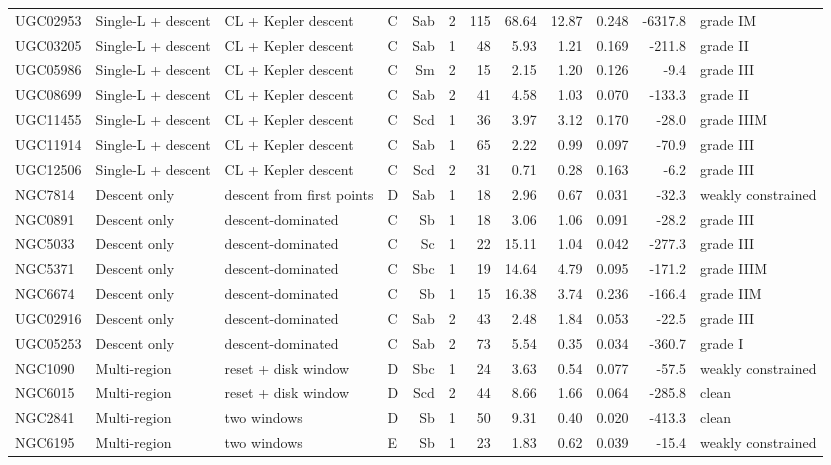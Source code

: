 \documentclass[10pt]{article}
\begin{document}
\begin{landscape}
{\begin{longtable}{llllrrrrrrrl}
UGC02953 & Single-L + descent & CL + Kepler descent & C & Sab & 2 & 115 & 68.64 & 12.87 & 0.248 & -6317.8 & grade IM\\
UGC03205 & Single-L + descent & CL + Kepler descent & C & Sab & 1 & 48 & 5.93 & 1.21 & 0.169 & -211.8 & grade II\\
UGC05986 & Single-L + descent & CL + Kepler descent & C & Sm & 2 & 15 & 2.15 & 1.20 & 0.126 & -9.4 & grade III\\
UGC08699 & Single-L + descent & CL + Kepler descent & C & Sab & 2 & 41 & 4.58 & 1.03 & 0.070 & -133.3 & grade II\\
UGC11455 & Single-L + descent & CL + Kepler descent & C & Scd & 1 & 36 & 3.97 & 3.12 & 0.170 & -28.0 & grade IIIM\\
UGC11914 & Single-L + descent & CL + Kepler descent & C & Sab & 1 & 65 & 2.22 & 0.99 & 0.097 & -70.9 & grade III\\
UGC12506 & Single-L + descent & CL + Kepler descent & C & Scd & 2 & 31 & 0.71 & 0.28 & 0.163 & -6.2 & grade III\\
\midrule
NGC7814 & Descent only & descent from first points & D & Sab & 1 & 18 & 2.96 & 0.67 & 0.031 & -32.3 & weakly constrained\\
NGC0891 & Descent only & descent-dominated & C & Sb & 1 & 18 & 3.06 & 1.06 & 0.091 & -28.2 & grade III\\
NGC5033 & Descent only & descent-dominated & C & Sc & 1 & 22 & 15.11 & 1.04 & 0.042 & -277.3 & grade III\\
NGC5371 & Descent only & descent-dominated & C & Sbc & 1 & 19 & 14.64 & 4.79 & 0.095 & -171.2 & grade IIIM\\
NGC6674 & Descent only & descent-dominated & C & Sb & 1 & 15 & 16.38 & 3.74 & 0.236 & -166.4 & grade IIM\\
UGC02916 & Descent only & descent-dominated & C & Sab & 2 & 43 & 2.48 & 1.84 & 0.053 & -22.5 & grade III\\
UGC05253 & Descent only & descent-dominated & C & Sab & 2 & 73 & 5.54 & 0.35 & 0.034 & -360.7 & grade I\\
\midrule
NGC1090 & Multi-region & reset + disk window & D & Sbc & 1 & 24 & 3.63 & 0.54 & 0.077 & -57.5 & weakly constrained\\
NGC6015 & Multi-region & reset + disk window & D & Scd & 2 & 44 & 8.66 & 1.66 & 0.064 & -285.8 & clean\\
NGC2841 & Multi-region & two windows & D & Sb & 1 & 50 & 9.31 & 0.40 & 0.020 & -413.3 & clean\\
NGC6195 & Multi-region & two windows & E & Sb & 1 & 23 & 1.83 & 0.62 & 0.039 & -15.4 & weakly constrained\\

\end{longtable}}
\end{landscape}
\end{document}
